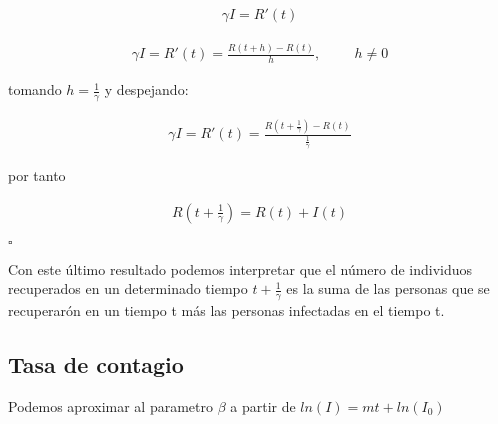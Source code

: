 \begin{Dem}
\begin{align*}
\gamma I = R'(t)
\end{align*}

\begin{align*}
\gamma I = R'(t) = \frac{R\left( t + h \right) - R\left(t\right)}{h}, \hspace{1cm} h \neq 0
\end{align*}

tomando $h = \frac{1}{\gamma}$ y despejando: 

\begin{align*}
\gamma I = R'(t) = \frac{R\left( t + \frac{1}{\gamma} \right) - R\left(t\right)}{\frac{1}{\gamma}}
\end{align*}

por tanto

\begin{align*}
R\left( t + \frac{1}{\gamma} \right) = R(t) + I(t)
\end{align*}

\hfill	$\square$
\end{Dem}

Con este último resultado podemos interpretar que el número de individuos recuperados en un determinado tiempo $t + \frac {1}{\gamma}$  es la suma de las personas que se recuperarón en un tiempo t más las personas infectadas en el tiempo t.

\subsection{\textbf{Tasa de contagio}}

\begin{Af}
Podemos aproximar al parametro $\beta$ a partir de $ln(I) = mt + ln(I_{0})$\cite{Algeria}
\end{Af}

